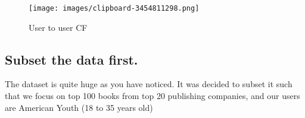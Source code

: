 \documentclass[
]{report}
\begin{document}
\begin{figure}[H]

{\centering \texttt{[image: images/clipboard-3454811298.png]}

}

\caption{User to user CF}

\end{figure}%

\subsection{Subset the data first.}\label{subset-the-data-first.}

The dataset is quite huge as you have noticed. It was decided to subset
it such that we focus on top 100 books from top 20 publishing companies,
and our users are American Youth (18 to 35 years old)
\end{document}

